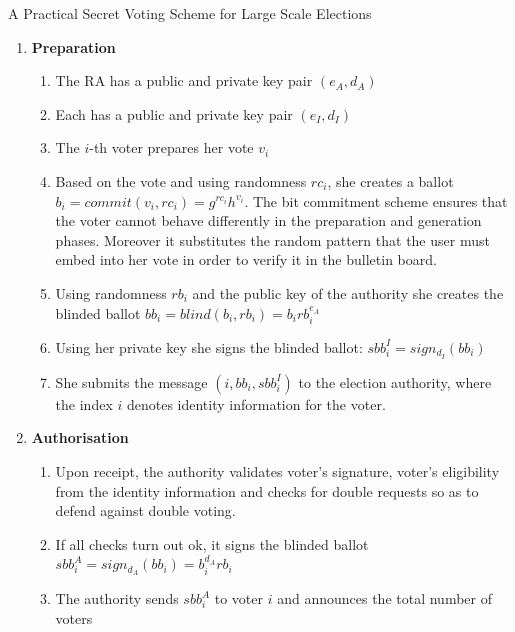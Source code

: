 \documentclass{beamer}
\begin{document}
\begin{frame}[allowframebreaks]{A Practical Secret Voting Scheme for Large Scale Elections \cite{FOO92}}
\begin{enumerate}
\item \textbf{Preparation}
\begin{enumerate}
\item The RA has a public and private key pair $(e_A, d_A)$
\item Each has a public and private key pair $(e_I, d_I)$
\item The $i$-th voter prepares her vote $v_i$
\item Based on the vote and using randomness $rc_i$, she creates a ballot $b_i = commit(v_i, rc_i) = g^{rc_i} h^{v_i}$. 
The bit commitment scheme ensures that the voter cannot behave differently in the preparation and generation phases. Moreover it substitutes the random pattern that the user must embed into her vote in order to verify it in the bulletin board.
\item Using randomness $rb_i$ and the public key of the authority she creates the blinded ballot $bb_i = blind(b_i,rb_i) = b_i rb_{i}^{e_A}$
\item Using her private key she signs the blinded ballot: $sbb^I_i = sign_{d_I}(bb_i)$
\item She submits the message $(i,bb_i,sbb^I_i)$ to the election authority, where the index $i$ denotes identity information for the voter.
\end{enumerate}
\item \textbf{Authorisation}
\begin{enumerate}
\item Upon receipt, the authority validates voter's signature, voter's eligibility from the identity information and checks for double requests so as to defend against double voting.  
\item If all checks turn out ok, it signs the blinded ballot $sbb_i^A = sign_{d_A}(bb_i) = b_i^{d_A} rb_{i}$
\item The authority sends $sbb_i^A$ to voter $i$ and announces the total number of voters
\end{enumerate}

\framebreak


\end{enumerate}
\end{frame}
\end{document}

